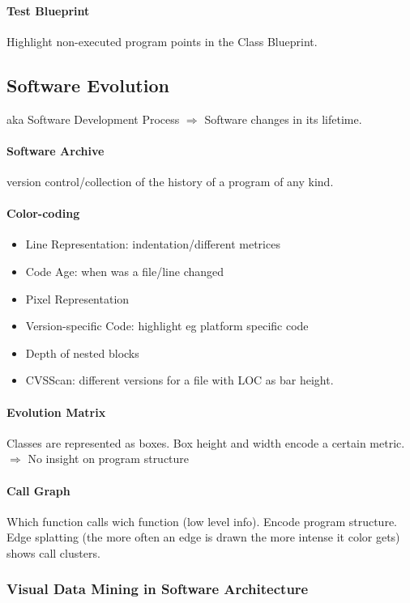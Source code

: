 \documentclass[10pt,a4paper]{article}
\begin{document}
	\paragraph{Test Blueprint} Highlight non-executed program points in the Class Blueprint. 
	
	
	\subsection{Software Evolution}
	aka Software Development Process $ \Rightarrow $ Software changes in its lifetime.
	
	\paragraph{Software Archive} version control/collection of the history of a program of any kind. 
	
	\paragraph{Color-coding}
	\begin{itemize}
		\item Line Representation: indentation/different metrices
		\item Code Age: when was a file/line changed
		\item Pixel Representation
		\item Version-specific Code: highlight eg platform specific code
		\item Depth of nested blocks
		\item CVSScan: different versions for a file with LOC as bar height.
	\end{itemize}
	
	\paragraph{Evolution Matrix} Classes are represented as boxes. Box height and width encode a certain metric. $ \Rightarrow $ No insight on program structure
	
	\paragraph{Call Graph} Which function calls wich function (low level info). Encode program structure. Edge splatting (the more often an edge is drawn the more intense it color gets) shows call clusters.
	
	\subsubsection{Visual Data Mining in Software Architecture}
\end{document}
